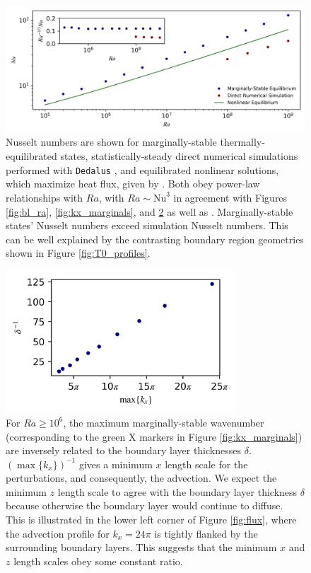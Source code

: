 \documentclass[reprint,amsmath,amssymb,aps]{revtex4-1}
\newcommand\Nu{\mathrm{Nu}}
\begin{document}
\begin{figure}
    \centering
    \includegraphics[width=7.1in]{nu_ra.PNG}
    \caption{Nusselt numbers are shown for marginally-stable thermally-equilibrated states, statistically-steady direct numerical simulations performed with \texttt{Dedalus} \cite{Anders_cd}, and equilibrated nonlinear solutions, which maximize heat flux, given by \cite{Waleffe}. 
    Both obey power-law relationships with $Ra$, with $Ra \sim \Nu^3$ in agreement with Figures \ref{fig:bl_ra}, \ref{fig:kx_marginals}, and \ref{fig:del_inv} as well as \cite{Malkus}. 
    Marginally-stable states' Nusselt numbers exceed simulation Nusselt numbers. 
    This can be well explained by the contrasting boundary region geometries shown in Figure \ref{fig:T0_profiles}.}%
    \label{fig:nu_vs_ra}%
\end{figure}

\begin{figure}
    \centering
    \includegraphics[width=3.4in]{del_kx_inv.png}
    \caption{For $Ra \geq 10^6$, the maximum marginally-stable wavenumber (corresponding to the green X markers in Figure \ref{fig:kx_marginals}) are inversely related to the boundary layer thicknesses $\delta$. 
    $(\max \{ k_x \})^{-1}$ gives a minimum $x$ length scale for the perturbations, and consequently, the advection. 
    We expect the minimum $z$ length scale to agree with the boundary layer thickness $\delta$ because otherwise the boundary layer would continue to diffuse. 
    This is illustrated in the lower left corner of Figure \ref{fig:flux}, where the advection profile for $k_x = 24\pi$ is tightly flanked by the surrounding boundary layers. 
    This suggests that the minimum $x$ and $z$ length scales obey some constant ratio.}
    \label{fig:del_inv}
\end{figure}
\end{document}
